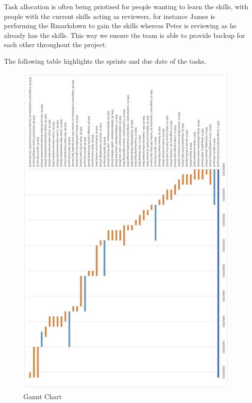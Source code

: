 \documentclass[mstat,12pt]{unswthesis}
\begin{document}
Task allocation is often being priotised for people wanting to learn the
skills, with people with the current skills acting as reviewers, for
instance James is performing the Rmarkdown to gain the skills whereas
Peter is reviewing as he already has the skills. This way we ensure the
team is able to provide backup for each other throughout the project.

The following table highlights the sprints and due date of the tasks.

\newpage

\begin{figure}
\centering
\includegraphics{Gannt.jpg}
\caption{Gannt Chart}
\end{figure}



\end{document}
